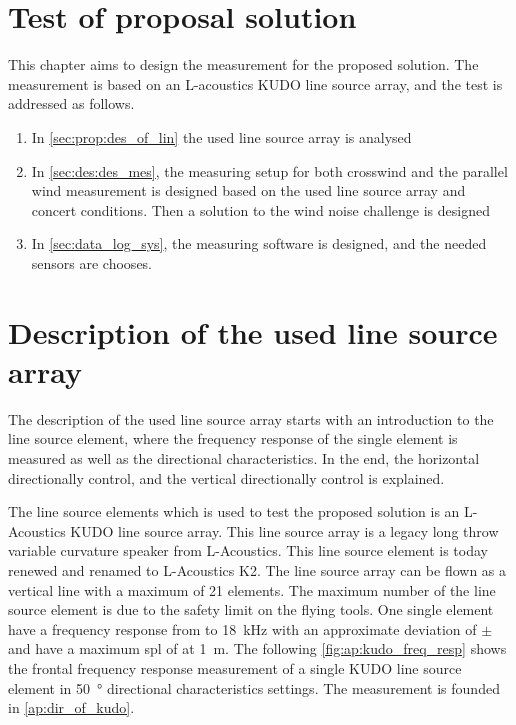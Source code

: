 \section{Test of proposal solution}
This chapter aims to design the measurement for the proposed solution. The measurement is based on an L-acoustics KUDO line source array, and the test is addressed as follows.




\begin{enumerate}
\item In \autoref{sec:prop:des_of_lin} the used line source array is analysed 
\item In \autoref{sec:des:des_mes}, the measuring setup for both crosswind and the parallel wind measurement is designed based on the used line source array and concert conditions. Then a solution to the wind noise challenge is designed
\item In \autoref{sec:data_log_sys}, the measuring software is designed, and the needed sensors are chooses. 
\end{enumerate}





\section{Description of the used line source array}\label{sec:prop:des_of_lin}

The description of the used line source array starts with an introduction to the line source element, where the frequency response of the single element is measured as well as the directional characteristics. In the end, the horizontal directionally control, and the vertical directionally control is explained.

The line source elements which is used to test the proposed solution is an L-Acoustics KUDO line source array. This line source array is a legacy long throw variable curvature speaker from L-Acoustics. This line source element is today renewed and renamed to L-Acoustics K2. 
The line source array can be flown as a vertical line with a maximum of 21 elements. The maximum number of the line source element is due to the safety limit on the flying tools. 
One single element have a frequency response from  to \SI{18}{\kilo\hertz} with an approximate deviation of $\pm$  and have a maximum \gls{spl} of  at \SI{1}{\meter}. The following \autoref{fig:ap:kudo_freq_resp} shows the frontal frequency response measurement of a single KUDO line source element in \SI{50}{\degree} directional characteristics settings. The measurement is founded in \autoref{ap:dir_of_kudo}.


